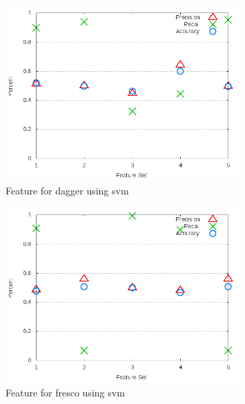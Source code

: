 \begin{figure}[!ht]
    \centering
        \includegraphics[width=0.8\textwidth]{images/svm/test_3/dagger_sample_range}
        \caption{Feature for dagger using \gls{svm}}
        \label{fig:test_3_dagger_svm}
\end{figure}



\begin{figure}[!ht]
    \centering
        \includegraphics[width=0.8\textwidth]{images/svm/test_3/fresco_sample_range}
        \caption{Feature for fresco using \gls{svm}}
        \label{fig:test_3_fresco_svm}
\end{figure}

